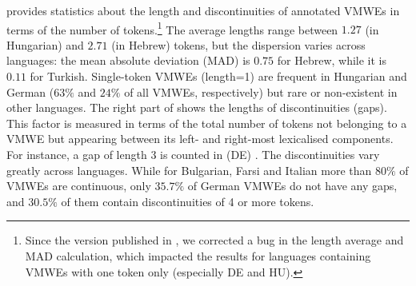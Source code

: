 \documentclass[output=paper,
modfonts,
]{langscibook}
\begin{document}
 provides statistics about the length and discontinuities of annotated VMWEs in terms of the number of tokens.\footnote{Since the version published in \citet{MWEWorkshop}, we corrected a bug in the length average and MAD calculation, which impacted the results for languages containing VMWEs with one token only (especially DE and HU).} %
The average lengths range between 
$1.27$ (in Hungarian) and $2.71$ (in Hebrew) tokens, 
but the dispersion varies across languages: the mean absolute deviation (MAD) is $0.75$ for Hebrew, while it is $0.11$ for Turkish. Single-token VMWEs (length=1) are frequent in Hungarian and German ($63\%$ and $24\%$ %
of all VMWEs, respectively) but rare or non-existent in other languages. %
The right part of  shows the lengths of discontinuities (gaps). This factor is measured in terms of the total number of tokens not belonging to a VMWE but appearing between its left- and  right-most lexicalised components. For instance, a gap of length 3 is counted in (DE) . 
The discontinuities vary greatly across languages. While for Bulgarian, Farsi and Italian more than $80\%$ of VMWEs are continuous, only $35.7\%$ of German VMWEs do not have any gaps, and $30.5\%$ of them contain discontinuities of 4 or more tokens.
\end{document}
